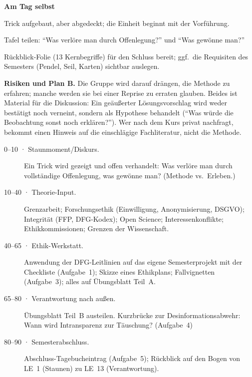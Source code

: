\begin{vorbereitung}
\textbf{Am Tag selbst}
\begin{checkliste}
  \item Trick aufgebaut, aber abgedeckt; die Einheit beginnt mit der
    Vorführung.
  \item Tafel teilen: \enquote{Was verlöre man durch Offenlegung?} und
    \enquote{Was gewönne man?}
  \item Rückblick-Folie (13 Kernbegriffe) für den Schluss bereit; ggf.\
    die Requisiten des Semesters (Pendel, Seil, Karten) sichtbar
    auslegen.
\end{checkliste}

\textbf{Risiken und Plan B.} Die Gruppe wird darauf drängen, die Methode zu
erfahren; manche werden sie bei einer Reprise zu erraten glauben. Beides
ist Material für die Diskussion: Ein geäußerter Lösungsvorschlag wird
weder bestätigt noch verneint, sondern als Hypothese behandelt
(\enquote{Was würde die Beobachtung sonst noch erklären?}). Wer nach dem
Kurs privat nachfragt, bekommt einen Hinweis auf die einschlägige
Fachliteratur, nicht die Methode.
\end{vorbereitung}

\begin{ablauf}
\begin{description}
\item[0--10 · Staunmoment/Diskurs.] Ein Trick wird gezeigt und offen
  verhandelt: Was verlöre man durch vollständige Offenlegung, was gewönne
  man? (Methode vs.\ Erleben.)
\item[10--40 · Theorie-Input.] Grenzarbeit; Forschungsethik (Einwilligung,
  Anonymisierung, DSGVO); Integrität (FFP, DFG-Kodex); Open Science;
  Interessenkonflikte; Ethikkommissionen; Grenzen der Wissenschaft.
\item[40--65 · Ethik-Werkstatt.] Anwendung der DFG-Leitlinien auf das
  eigene Semesterprojekt mit der Checkliste (Aufgabe~1); Skizze eines
  Ethikplans; Fallvignetten (Aufgabe~3); alles auf Übungsblatt Teil~A.
\item[65--80 · Verantwortung nach außen.] Übungsblatt Teil~B austeilen.
  Kurzbrücke zur Desinformationsabwehr: Wann wird Intransparenz zur
  Täuschung? (Aufgabe~4)
\item[80--90 · Semesterabschluss.] Abschluss-Tagebucheintrag
  (Aufgabe~5); Rückblick
  auf den Bogen von LE~1 (Staunen) zu LE~13 (Verantwortung).
\end{description}
\end{ablauf}

